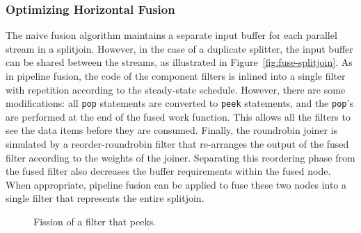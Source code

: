 \subsubsection{Optimizing Horizontal Fusion}

The naive fusion algorithm maintains a separate input buffer for each
parallel stream in a splitjoin.  However, in the case of a duplicate
splitter, the input buffer can be shared between the streams, as
illustrated in Figure~\ref{fig:fuse-splitjoin}.  As in pipeline
fusion, the code of the component filters is inlined into a single
filter with repetition according to the steady-state schedule.
However, there are some modifications: all {\tt pop} statements are
converted to {\tt peek} statements, and the {\tt pop}'s are performed
at the end of the fused work function.  This allows all the filters to
see the data items before they are consumed.  Finally, the roundrobin
joiner is simulated by a reorder-roundrobin filter that re-arranges
the output of the fused filter according to the weights of the joiner.
Separating this reordering phase from the fused filter also decreases
the buffer requirements within the fused node.  When appropriate,
pipeline fusion can be applied to fuse these two nodes into a single
filter that represents the entire splitjoin.

\begin{figure}
\centering
{}
\caption{\protect\small Fission of a filter that does not peek.
\protect\label{fig:fission-nopeek}}
\vspace{18pt}
\caption{\protect\small Fission of a filter that peeks.  
\protect\label{fig:fission-peek}}
\end{figure}

